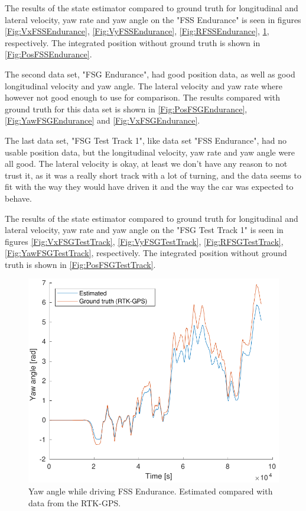 The results of the state estimator compared to ground truth for longitudinal  and lateral velocity, yaw rate and yaw angle on the "FSS Endurance" is seen in figures \ref{Fig:VxFSSEndurance}, \ref{Fig:VyFSSEndurance}, \ref{Fig:RFSSEndurance}, \ref{Fig:YawFSSEndurance}, respectively. The integrated position without ground truth is shown in \ref{Fig:PosFSSEndurance}. 

The second data set, "FSG Endurance", had good position data, as well as good longitudinal velocity and yaw angle. The lateral velocity and yaw rate where however not good enough to use for comparison. The results compared with ground truth for this data set is shown in \ref{Fig:PosFSGEndurance}, \ref{Fig:YawFSGEndurance} and \ref{Fig:VxFSGEndurance}. 

The last data set, "FSG Test Track 1", like data set "FSS Endurance", had no usable position data, but the longitudinal velocity, yaw rate and yaw angle were all good. The lateral velocity is okay, at least we don't have any reason to not trust it, as it was a really short track with a lot of turning, and the data seems to fit with the way they would have driven it and the way the car was expected to behave. 

The results of the state estimator compared to ground truth for longitudinal  and lateral velocity, yaw rate and yaw angle on the "FSG Test Track 1" is seen in figures \ref{Fig:VxFSGTestTrack}, \ref{Fig:VyFSGTestTrack}, \ref{Fig:RFSGTestTrack}, \ref{Fig:YawFSGTestTrack}, respectively. The integrated position without ground truth is shown in \ref{Fig:PosFSGTestTrack}. 



\begin{figure}
    \centering
    \includegraphics[width=0.8\linewidth]{0_Images/6_Results/yawFSSEndurance.pdf}
    \caption[Yaw angle while driving FSS Endurance.]
    {Yaw angle while driving FSS Endurance. Estimated compared with data from the RTK-GPS.}
    \label{Fig:YawFSSEndurance}
\end{figure}

